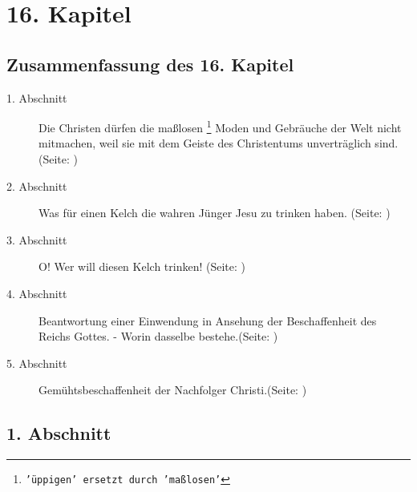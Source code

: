 

\chapter{16. Kapitel} \label{kap16}
\section{Zusammenfassung des 16. Kapitel}
\footnotesize
\begin{description}
\item[1. Abschnitt] Die Christen dürfen die maßlosen
\footnote{\texttt{'üppigen' ersetzt durch 'maßlosen'}}
Moden und Gebräuche der Welt
nicht mitmachen, weil sie mit dem Geiste des Christentums unverträglich sind. (Seite: \pageref{kap16_ab1})
\item[2. Abschnitt] Was für einen Kelch die wahren Jünger Jesu zu trinken haben. (Seite: \pageref{kap16_ab2})
\item[3. Abschnitt] O! Wer will diesen Kelch trinken! (Seite: \pageref{kap16_ab3})
\item[4. Abschnitt] Beantwortung einer Einwendung in Ansehung der Beschaffenheit
des Reichs Gottes. - Worin dasselbe bestehe.(Seite: \pageref{kap16_ab4})
\item[5. Abschnitt] Gemühtsbeschaffenheit der Nachfolger Christi.(Seite: \pageref{kap16_ab5})

\end{description}
\normalsize

\section{1. Abschnitt} \label{kap16_ab1}


